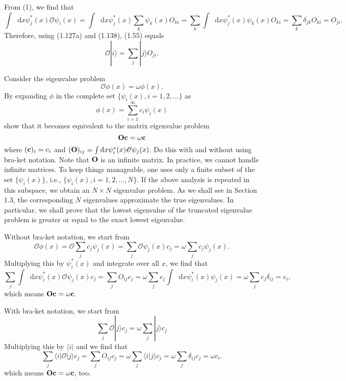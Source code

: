 \documentclass[a4paper]{book}
\newcounter{exercise}[chapter]
\newcounter{solution}[chapter]
\newcommand*{\dif}{\mathop{}\!\mathrm{d}}
\newcommand{\Op}{{\bf O}}
\begin{document}
	\begin{solution}
	
	From (1), we find that
	\[
		\int \dif x \psi^*_j(x) \mathscr{O} \psi_i(x) = \int \dif x \psi^*_j(x) \sum_{k} \psi_k(x) O_{ki} = \sum_{k} \int \dif x \psi^*_j(x) \psi_k(x) O_{ki} = \sum_{k} \delta_{jk} O_{ki} = O_{ji} .
	\]
	Therefore, using (1.127a) and (1.138), (1.55) equals
	\[
		\mathscr{O} | i \rangle = \sum_j | j \rangle O_{ji} .
	\]
	
	\end{solution}	
	
	\begin{exercise}
	Consider the eigenvalue problem
	\[
		\mathscr{O} \phi(x) = \omega \phi(x).
	\]
	By expanding $\phi$ in the complete set $\{\psi_i(x),i=1,2,\ldots\}$ as
	\begin{equation*}
		\phi(x) = \sum_{i=1}^\infty c_i \psi_i(x)
	\end{equation*}
	show that it becomes equivalent to the matrix eigenvalue problem
	\begin{equation*}
		\Op {\bf c} = \omega {\bf c}
	\end{equation*}
	where $({\bf c})_i=c_i$ and $({\bf O})_{ij} = \int \dif x \psi^*_i(x)\mathscr{O}\psi_j(x)$. Do this with and without using bra-ket notation. Note that $\Op$ is an infinite matrix. In practice, we cannot handle infinite matrices. To keep things manageable, one uses only a finite subset of the set $\{\psi_i(x)\}$, i.e., $\{\psi_i(x),i=1,2,\ldots, N\}$. If the above analysis is repeated in this subspace, we obtain an $N \times N$ eigenvalue problem. As we shall see in Section 1.3, the corresponding $N$ eigenvalues approximate the true eigenvalues. In particular, we shall prove that the lowest eigenvalue of the truncated eigenvalue problem is greater or equal to the exact lowest eigenvalue.
	\end{exercise}
	
	\begin{solution}
	
	Without bra-ket notation, we start from
	\[
		\mathscr{O} \phi(x) = \mathscr{O} \sum_j c_j \psi_j(x) = \sum_j \mathscr{O} \psi_j(x) c_j = \omega \sum_j c_j \psi_j(x) .
	\]
	Multiplying this by $\psi^*_i(x)$ and integrate over all $x$, we find that
	\[
		\sum_j \int \dif x \psi^*_i(x) \mathscr{O} \psi_j(x) c_j = \sum_j O_{ij} c_j = \omega \sum_j c_j \int \dif x \psi^*_i(x) \psi_j(x) = \omega \sum_j c_j \delta_{ij} = c_i ,
	\]
	which means $\Op {\bf c} = \omega {\bf c}$.
	
	With bra-ket notation, we start from
	\[
		\sum_j \mathscr{O} | j \rangle c_j = \omega \sum_j | j \rangle c_j
	\]
	Multiplying this by $\langle i |$ and we find that
	\[
		\sum_j \langle i | \mathscr{O} | j \rangle c_j = \sum_j O_{ij} c_j = \omega \sum_j \langle i | j \rangle c_j = \omega \sum_j \delta_{ij} c_j = \omega c_i .
	\]
	which means $\Op {\bf c} = \omega {\bf c}$, too.
	\end{solution}
	
\end{document}
